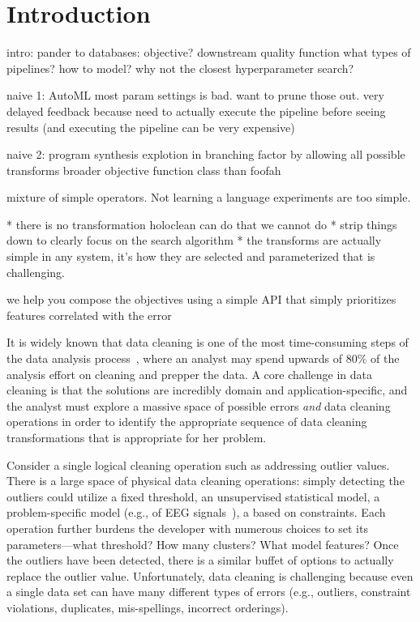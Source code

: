 \section{Introduction}\label{intro}\sloppy

intro:
pander to databases: 
objective?  downstream quality function
what types of pipelines? how to model?
why not the closest hyperparameter search?

naive 1: AutoML
most param settings is bad.  want to prune those out.
very delayed feedback because need to actually execute the pipeline before seeing results (and executing the pipeline can be very expensive)

naive 2: program synthesis
explotion in branching factor by allowing all possible transforms
broader objective function class than foofah

mixture of simple operators.  Not learning a language
experiments are too simple.  

* there is no transformation holoclean can do that we cannot do
* strip things down to clearly focus on the search algorithm 
* the transforms are actually simple in any system, it's how they are selected and parameterized that is challenging.  

we help you compose the objectives using a simple API that simply prioritizes features correlated with the error


It is widely known that data cleaning is one of the most time-consuming steps of the data analysis process~\cite{nytimes}, where an analyst may spend upwards of 80\% of the analysis effort on cleaning and prepper the data.  A core challenge in data cleaning is that the solutions are incredibly domain and application-specific, and the analyst must explore a massive space of possible errors {\it and} data cleaning operations in order to identify the appropriate sequence of data cleaning transformations that is appropriate for her problem.

Consider a single logical cleaning operation such as addressing outlier values.  There is a large space of physical data cleaning operations: simply detecting the outliers could utilize a fixed threshold, an unsupervised statistical model, a problem-specific model (e.g., of EEG signals~\cite{}), a based on constraints.  Each operation further burdens the developer with numerous choices to set its parameters---what threshold?  How many clusters? What model features?   Once the outliers have been detected, there is a similar buffet of options to actually replace the outlier value.     Unfortunately, data cleaning is challenging because even a single data set can have many different types of errors (e.g., outliers, constraint violations, duplicates, mis-spellings, incorrect orderings).

